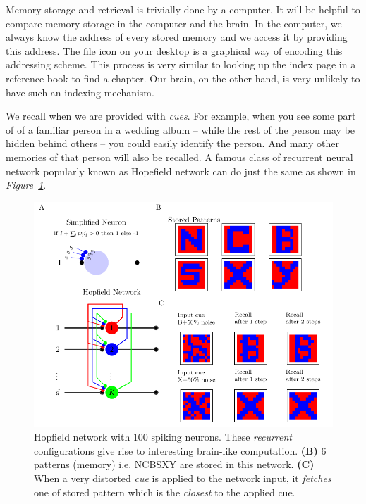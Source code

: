 \documentclass[]{resonance}
\newcommand\Fig[1]{\textit{Figure~\ref{#1}}}
\begin{document}
Memory storage and retrieval is trivially done by a computer. It will be helpful
to compare memory storage in the computer and the brain. In the computer, we
always know the address of every stored memory and we access it by providing
this address. The file icon on your desktop is a graphical way of encoding this
addressing scheme. This process is very similar to looking up the index page in
a reference book to find a chapter. Our brain, on the other hand, is very
unlikely to have such an indexing mechanism. 

We recall when we are provided with \textit{cues}. For example, when you see
some part of of a familiar person in a wedding album -- while the rest of the
person may be hidden behind others -- you could easily identify the person. And
many other memories of that person will also be recalled. A famous class of
recurrent neural network popularly known as Hopefield network can do just the
same as shown in \Fig{fig:hopfield}.

\begin{figure}[!hb]
    \centering
    \caption{Hopfield network with 100 spiking neurons. These \emph{recurrent} 
        configurations give rise to interesting brain-like
        computation. \textbf{(B)} 6 patterns (memory) i.e. NCBSXY are stored in this
        network. \textbf{(C)} When a very distorted \textit{cue} is applied to
        the network input, it \textit{fetches} one of stored pattern which is
        the \emph{closest} to the applied cue.
    }\label{fig:hopfield}
    \includegraphics[width=\linewidth]{./hopfield.pdf}
\end{figure}
\end{document}
